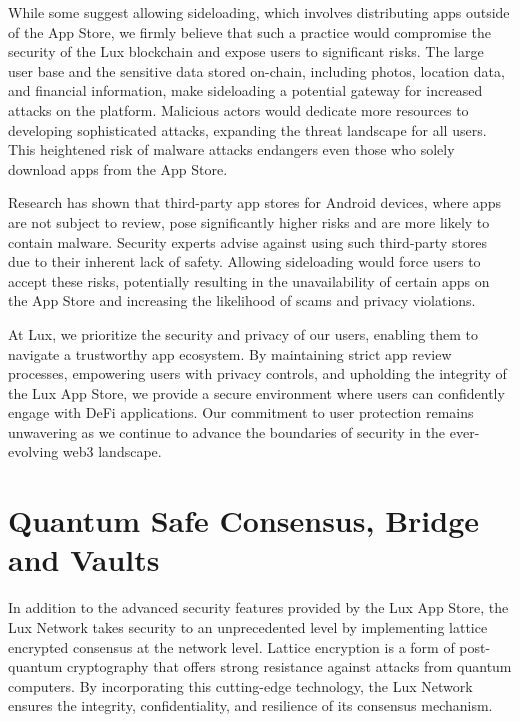 \documentclass[11pt]{article}
\begin{document}
While some suggest allowing sideloading, which involves distributing apps outside of the App Store, we firmly believe that such a practice would compromise the security of the Lux blockchain and expose users to significant risks. The large user base and the sensitive data stored on-chain, including photos, location data, and financial information, make sideloading a potential gateway for increased attacks on the platform. Malicious actors would dedicate more resources to developing sophisticated attacks, expanding the threat landscape for all users. This heightened risk of malware attacks endangers even those who solely download apps from the App Store.


Research has shown that third-party app stores for Android devices, where apps are not subject to review, pose significantly higher risks and are more likely to contain malware. Security experts advise against using such third-party stores due to their inherent lack of safety. Allowing sideloading would force users to accept these risks, potentially resulting in the unavailability of certain apps on the App Store and increasing the likelihood of scams and privacy violations.


At Lux, we prioritize the security and privacy of our users, enabling them to navigate a trustworthy app ecosystem. By maintaining strict app review processes, empowering users with privacy controls, and upholding the integrity of the Lux App Store, we provide a secure environment where users can confidently engage with DeFi applications. Our commitment to user protection remains unwavering as we continue to advance the boundaries of security in the ever-evolving web3 landscape.


\section{Quantum Safe Consensus, Bridge and Vaults}

In addition to the advanced security features provided by the Lux App Store, the Lux Network takes security to an unprecedented level by implementing lattice encrypted consensus at the network level. Lattice encryption is a form of post-quantum cryptography that offers strong resistance against attacks from quantum computers. By incorporating this cutting-edge technology, the Lux Network ensures the integrity, confidentiality, and resilience of its consensus mechanism.
\end{document}
